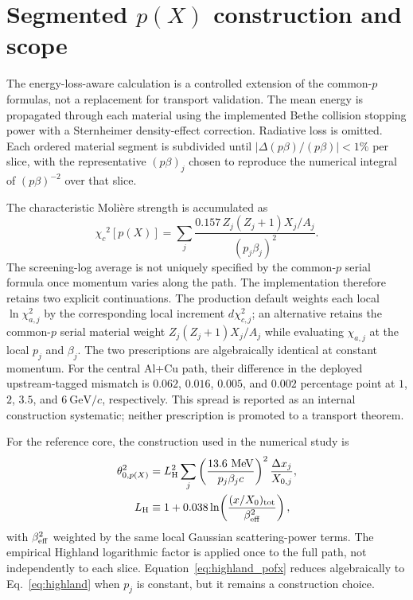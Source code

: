 \documentclass[aps,pra,reprint,longbibliography,floatfix]{revtex4-2}
\newcommand{\chic}{\ensuremath{\chi_c}}
\begin{document}
\section{Segmented $p(X)$ construction and scope}\label{app:pofx}
The energy-loss-aware calculation is a controlled extension of the common-$p$ formulas, not a replacement for transport validation.  The mean energy is propagated through each material using the implemented Bethe collision stopping power with a Sternheimer density-effect correction.  Radiative loss is omitted.  Each ordered material segment is subdivided until $|\Delta(p\beta)/(p\beta)|<1\%$ per slice, with the representative $(p\beta)_j$ chosen to reproduce the numerical integral of $(p\beta)^{-2}$ over that slice.

The characteristic Moli\`ere strength is accumulated as
\begin{equation}\label{eq:chic_pofx}
\chic^2[p(X)]=\sum_j
\frac{0.157\,Z_j(Z_j+1)X_j/A_j}{(p_j\beta_j)^2}.
\end{equation}
The screening-log average is not uniquely specified by the common-$p$ serial formula once momentum varies along the path.  The implementation therefore retains two explicit continuations.  The production default weights each local $\ln\chi_{a,j}^2$ by the corresponding local increment $d\chi_{c,j}^2$; an alternative retains the common-$p$ serial material weight $Z_j(Z_j+1)X_j/A_j$ while evaluating $\chi_{a,j}$ at the local $p_j$ and $\beta_j$.  The two prescriptions are algebraically identical at constant momentum.  For the central Al+Cu path, their difference in the deployed upstream-tagged mismatch is $0.062$, $0.016$, $0.005$, and $0.002$ percentage point at $1$, $2$, $3.5$, and $6~\mathrm{GeV}/c$, respectively.  This spread is reported as an internal construction systematic; neither prescription is promoted to a transport theorem.

For the reference core, the construction used in the numerical study is
\begin{align}
\theta_{0,p(X)}^2
&=L_{\rm H}^2\sum_j
\left(\frac{13.6~\mathrm{MeV}}{p_j\beta_j c}\right)^2
\frac{\Delta x_j}{X_{0,j}},\label{eq:highland_pofx}\\
L_{\rm H}
&\equiv1+0.038\ln\!\left(\frac{(x/X_0)_{\rm tot}}{\beta_{\rm eff}^2}\right),
\end{align}
with $\beta_{\rm eff}^2$ weighted by the same local Gaussian scattering-power terms.  The empirical Highland logarithmic factor is applied once to the full path, not independently to each slice.  Equation~\eqref{eq:highland_pofx} reduces algebraically to Eq.~\eqref{eq:highland} when $p_j$ is constant, but it remains a construction choice.
\end{document}
